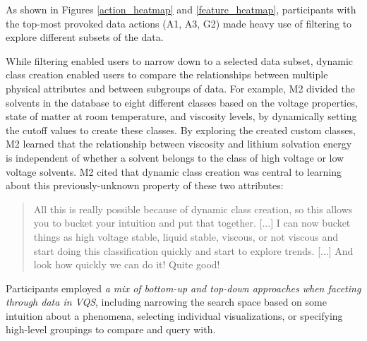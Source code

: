 As shown in Figures \ref{action_heatmap} and \ref{feature_heatmap}, participants with the top-most provoked data actions (A1, A3, G2) made heavy use of filtering to explore different subsets of the data. 
\par While filtering enabled users to narrow down to a selected data subset, dynamic class creation enabled users to compare the relationships between multiple physical attributes and between subgroups of data. For example, M2 divided the solvents in the database to eight different classes based on the voltage properties, state of matter at room temperature, and viscosity levels, by dynamically setting the cutoff values to create these classes. By exploring the created custom classes, M2 learned that the relationship between viscosity and lithium solvation energy is independent of whether a solvent belongs to the class of high voltage or low voltage solvents. M2 cited that dynamic class creation was central to learning about this previously-unknown property of these two attributes: 
\begin{quote}
All this is really possible because of dynamic class creation, so this allows you to bucket your intuition and put that together. [...] I can now bucket things as high voltage stable, liquid stable, viscous, or not viscous and start doing this classification quickly and start to explore trends. [...] And look how quickly we can do it! Quite good!
\end{quote}
\par Participants employed \emph{a mix of bottom-up and top-down approaches when faceting through data in VQS}, including narrowing the search space based on some intuition about a phenomena, selecting individual visualizations, or specifying high-level groupings to compare and query with.
